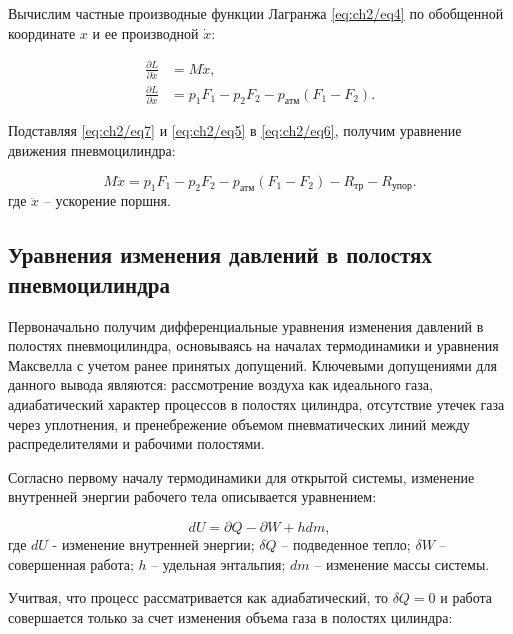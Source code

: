 Вычислим частные производные функции Лагранжа \eqref{eq:ch2/eq4} по обобщенной координате $x$ и ее производной $\dot{x}$:

\begin{equation}\label{eq:ch2/eq7}
    \begin{aligned}
        \frac{\partial L}{\partial \dot{x}} & = M \dot{x},                                    \\
        \frac{\partial L}{\partial x}       & = p_1 F_1 - p_2 F_2 - p_\text{атм} (F_1 - F_2).
    \end{aligned}
\end{equation}

Подставляя \eqref{eq:ch2/eq7} и \eqref{eq:ch2/eq5} в \eqref{eq:ch2/eq6}, получим уравнение движения пневмоцилиндра:

\begin{equation}\label{eq:ch2/eq8}
    M \ddot{x} = p_1 F_1 - p_2 F_2 - p_\text{атм} (F_1 - F_2) - R_{\text{тр}} - R_{\text{упор}}.
\end{equation}
где $\ddot{x}$ -- ускорение поршня.

\subsection{Уравнения изменения давлений в полостях пневмоцилиндра}\label{sec:ch2/sec2/subsec2}

Первоначально получим дифференциальные уравнения изменения давлений в
полостях пневмоцилиндра, основываясь на началах термодинамики
и уравнения Максвелла с учетом ранее принятых допущений.
Ключевыми допущениями для данного вывода являются: рассмотрение
воздуха как идеального газа, адиабатический характер процессов в полостях
цилиндра, отсутствие утечек газа через уплотнения, и пренебрежение объемом
пневматических линий между распределителями и рабочими полостями.

Согласно первому началу термодинамики для открытой системы, изменение внутренней энергии рабочего тела
описывается уравнением:

\begin{equation}
    dU = \partial Q - \partial W + hdm,
\end{equation}
где $dU$ - изменение внутренней энергии;
$δQ$ -- подведенное тепло;
$δW$ -- совершенная работа;
$h$ -- удельная энтальпия;
$dm$ -- изменение массы системы.

Учитвая, что процесс рассматривается как адиабатический, то $δQ = 0$ и
работа совершается только за счет изменения объема газа в полостях цилиндра:

